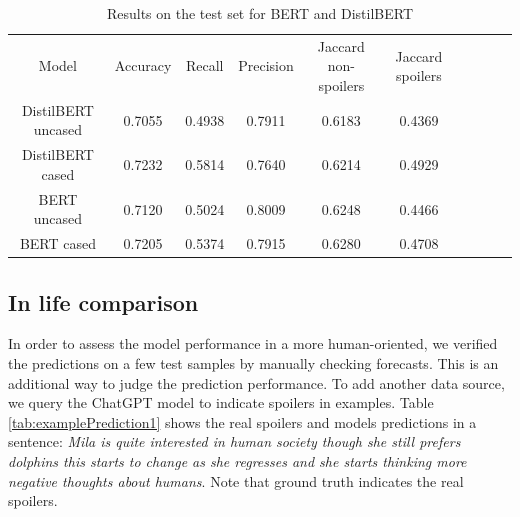 \documentclass[11pt]{article}
\begin{document}
\begin{table}[t]
    \centering
\begin{tabular}{llllllllll}
\cline{1-6}
\multicolumn{1}{|c|}{Model}              & \multicolumn{1}{c|}{Accuracy} & \multicolumn{1}{c|}{Recall} & \multicolumn{1}{c|}{Precision} & \multicolumn{1}{c|}{Jaccard non-spoilers} & \multicolumn{1}{c|}{Jaccard spoilers} &  &  &  &  \\ \cline{1-6}
\multicolumn{1}{|c|}{DistilBERT uncased} & \multicolumn{1}{c|}{0.7055}   & \multicolumn{1}{c|}{0.4938} & \multicolumn{1}{c|}{0.7911}    & \multicolumn{1}{c|}{0.6183}               & \multicolumn{1}{c|}{0.4369}           &  &  &  &  \\ \cline{1-6}
\multicolumn{1}{|c|}{DistilBERT cased}    & \multicolumn{1}{c|}{0.7232}   & \multicolumn{1}{c|}{0.5814} & \multicolumn{1}{c|}{0.7640}    & \multicolumn{1}{c|}{0.6214}               & \multicolumn{1}{c|}{0.4929}           &  &  &  &  \\ \cline{1-6}
\multicolumn{1}{|c|}{BERT uncased}       & \multicolumn{1}{c|}{0.7120}   & \multicolumn{1}{c|}{0.5024} & \multicolumn{1}{c|}{0.8009}    & \multicolumn{1}{c|}{0.6248}               & \multicolumn{1}{c|}{0.4466}           &  &  &  &  \\ \cline{1-6}
\multicolumn{1}{|c|}{BERT cased}         & \multicolumn{1}{c|}{0.7205}   & \multicolumn{1}{c|}{0.5374} & \multicolumn{1}{c|}{0.7915}    & \multicolumn{1}{c|}{0.6280}               & \multicolumn{1}{c|}{0.4708}           &  &  &  &  \\ \cline{1-6} 
\end{tabular}
    \caption{Results on the test set for BERT and DistilBERT}
    \label{tab:resultsBertDistilBert}
\end{table}





\subsection{In life comparison}

In order to assess the model performance in a more human-oriented, we verified the predictions on a few test samples by manually checking forecasts. This is an additional way to judge the prediction performance. To add another data source, we query the ChatGPT model to indicate spoilers in examples. Table \ref{tab:examplePrediction1} shows the real spoilers and models predictions in a sentence: \emph{Mila is quite interested in human society though she still prefers dolphins this starts to change as she regresses and she starts thinking more negative thoughts about humans}. Note that ground truth indicates the real spoilers. 
\end{document}
